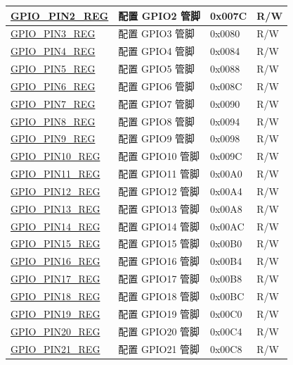 \begin{longtable}{ | p{6cm} | p{6.7cm} | p{1.3cm} | p{1.5cm} | }
\hyperref[regdesc:GPIOPINNREG]{GPIO\_PIN2\_REG} & 配置 GPIO2 管脚& 0x007C & R/W \\ \hline
\hyperref[regdesc:GPIOPINNREG]{GPIO\_PIN3\_REG} & 配置 GPIO3 管脚& 0x0080 & R/W \\ \hline
\hyperref[regdesc:GPIOPINNREG]{GPIO\_PIN4\_REG} & 配置 GPIO4 管脚 & 0x0084 & R/W \\ \hline
\hyperref[regdesc:GPIOPINNREG]{GPIO\_PIN5\_REG} & 配置 GPIO5 管脚& 0x0088 & R/W \\ \hline
\hyperref[regdesc:GPIOPINNREG]{GPIO\_PIN6\_REG} & 配置 GPIO6 管脚 & 0x008C & R/W \\ \hline
\hyperref[regdesc:GPIOPINNREG]{GPIO\_PIN7\_REG} & 配置 GPIO7 管脚& 0x0090 & R/W \\ \hline
\hyperref[regdesc:GPIOPINNREG]{GPIO\_PIN8\_REG} & 配置 GPIO8 管脚 & 0x0094 & R/W \\ \hline
\hyperref[regdesc:GPIOPINNREG]{GPIO\_PIN9\_REG} & 配置 GPIO9 管脚 & 0x0098 & R/W \\ \hline
\hyperref[regdesc:GPIOPINNREG]{GPIO\_PIN10\_REG} & 配置 GPIO10 管脚& 0x009C & R/W \\ \hline
\hyperref[regdesc:GPIOPINNREG]{GPIO\_PIN11\_REG} & 配置 GPIO11 管脚 & 0x00A0 & R/W \\ \hline
\hyperref[regdesc:GPIOPINNREG]{GPIO\_PIN12\_REG} & 配置 GPIO12 管脚 & 0x00A4 & R/W \\ \hline
\hyperref[regdesc:GPIOPINNREG]{GPIO\_PIN13\_REG} & 配置 GPIO13 管脚 & 0x00A8 & R/W \\ \hline
\hyperref[regdesc:GPIOPINNREG]{GPIO\_PIN14\_REG} & 配置 GPIO14 管脚 & 0x00AC & R/W \\ \hline
\hyperref[regdesc:GPIOPINNREG]{GPIO\_PIN15\_REG} & 配置 GPIO15 管脚 & 0x00B0 & R/W \\ \hline
\hyperref[regdesc:GPIOPINNREG]{GPIO\_PIN16\_REG} & 配置 GPIO16 管脚 & 0x00B4 & R/W \\ \hline
\hyperref[regdesc:GPIOPINNREG]{GPIO\_PIN17\_REG} & 配置 GPIO17 管脚 & 0x00B8 & R/W \\ \hline
\hyperref[regdesc:GPIOPINNREG]{GPIO\_PIN18\_REG} & 配置 GPIO18 管脚 & 0x00BC & R/W \\ \hline
\hyperref[regdesc:GPIOPINNREG]{GPIO\_PIN19\_REG} & 配置 GPIO19 管脚 & 0x00C0 & R/W \\ \hline
\hyperref[regdesc:GPIOPINNREG]{GPIO\_PIN20\_REG} & 配置 GPIO20 管脚 & 0x00C4 & R/W \\ \hline
\hyperref[regdesc:GPIOPINNREG]{GPIO\_PIN21\_REG} & 配置 GPIO21 管脚 & 0x00C8 & R/W \\ \hline

\end{longtable}
